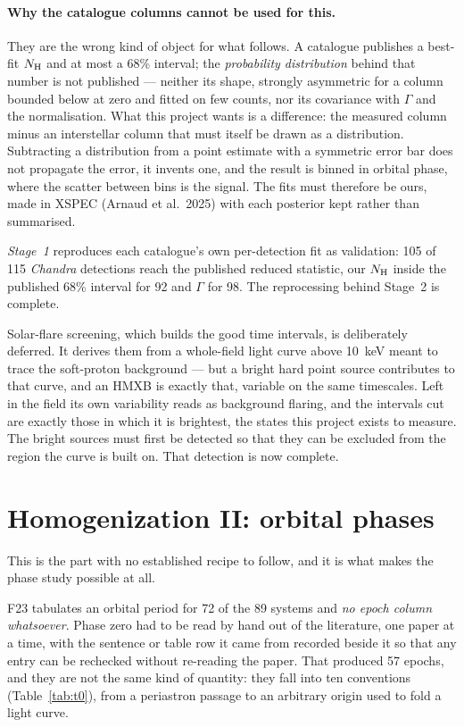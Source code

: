 \documentclass[10pt,a4paper]{article}
\begin{document}
\paragraph{Why the catalogue columns cannot be used for this.} They are the
wrong kind of object for what follows. A catalogue publishes a best-fit
$N_{\rm H}$ and at most a 68\% interval; the \emph{probability distribution}
behind that number is not published --- neither its shape, strongly asymmetric
for a column bounded below at zero and fitted on few counts, nor its covariance
with $\Gamma$ and the normalisation. What this project wants is a difference:
the measured column minus an interstellar column that must itself be drawn as a
distribution. Subtracting a distribution from a point estimate with a symmetric
error bar does not propagate the error, it invents one, and the result is binned
in orbital phase, where the scatter between bins is the signal. The fits must
therefore be ours, made in XSPEC (Arnaud et al.\ 2025) with each posterior kept
rather than summarised.

\emph{Stage~1} reproduces each catalogue's own per-detection fit as validation:
105 of 115 \textit{Chandra} detections reach the published reduced statistic,
our $N_{\rm H}$ inside the published 68\% interval for 92 and $\Gamma$ for 98.
The reprocessing behind Stage~2 is complete.

Solar-flare screening, which builds the good time intervals, is deliberately
deferred. It derives them from a whole-field light curve above 10~keV meant to
trace the soft-proton background --- but a bright hard point source contributes
to that curve, and an HMXB is exactly that, variable on the same timescales.
Left in the field its own variability reads as background flaring, and the
intervals cut are exactly those in which it is brightest, the states this
project exists to measure. The bright sources must first be detected so that
they can be excluded from the region the curve is built on. That detection is
now complete.

\section{Homogenization II: orbital phases}

This is the part with no established recipe to follow, and it is what makes the
phase study possible at all.

F23 tabulates an orbital period for 72 of the 89 systems and \emph{no epoch
column whatsoever}. Phase zero had to be read by hand out of the literature,
one paper at a time, with the sentence or table row it came from recorded
beside it so that any entry can be rechecked without re-reading the paper. That
produced 57 epochs, and they are not the same kind of quantity: they fall into
ten conventions (Table~\ref{tab:t0}), from a periastron passage to an arbitrary
origin used to fold a light curve.
\end{document}
